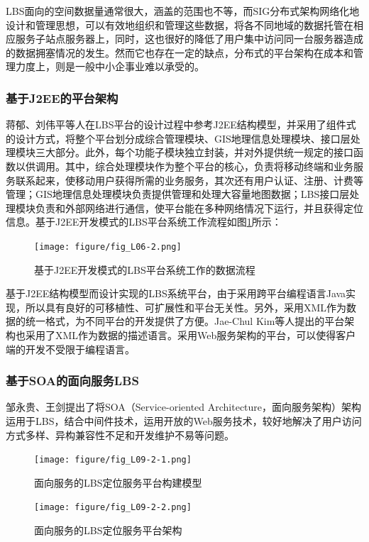 \documentclass{article}
\begin{document}
\begin{CJK}{UTF8}{gbsn}
	LBS面向的空间数据量通常很大，涵盖的范围也不等，而SIG分布式架构网络化地设计和管理思想，可以有效地组织和管理这些数据，将各不同地域的数据托管在相应服务子站点服务器上，同时，这也很好的降低了用户集中访问同一台服务器造成的数据拥塞情况的发生。然而它也存在一定的缺点，分布式的平台架构在成本和管理力度上，则是一般中小企事业难以承受的。

	\subsubsection{基于J2EE的平台架构}
  蒋郁、刘伟平等人在LBS平台的设计过程中参考J2EE结构模型，并采用了组件式的设计方式，将整个平台划分成综合管理模块、GIS地理信息处理模块、接口层处理模块三大部分。此外，每个功能子模块独立封装，并对外提供统一规定的接口函数以供调用\cite{L06}。其中，综合处理模块作为整个平台的核心，负责将移动终端和业务服务联系起来，使移动用户获得所需的业务服务，其次还有用户认证、注册、计费等管理；GIS地理信息处理模块负责提供管理和处理大容量地图数据；LBS接口层处理模块负责和外部网络进行通信，使平台能在多种网络情况下运行，并且获得定位信息。基于J2EE开发模式的LBS平台系统工作流程如图\ref{fig:L06-2}所示：

	\begin{figure}[htbp]
		\centering
		\texttt{[image: figure/fig\_L06-2.png]}
		\caption{基于J2EE开发模式的LBS平台系统工作的数据流程}
		\label{fig:L06-2}
	\end{figure}

  基于J2EE结构模型而设计实现的LBS系统平台，由于采用跨平台编程语言Java实现，所以具有良好的可移植性、可扩展性和平台无关性。另外，采用XML作为数据的统一格式，为不同平台的开发提供了方便。Jae-Chul Kim等人提出的平台架构也采用了XML作为数据的描述语言\cite{L13}。采用Web服务架构的平台，可以使得客户端的开发不受限于编程语言。

	\subsubsection{基于SOA的面向服务LBS}
  邹永贵、王剑提出了将SOA（Service-oriented Architecture，面向服务架构）架构运用于LBS，结合中间件技术，运用开放的Web服务技术，较好地解决了用户访问方式多样、异构兼容性不足和开发维护不易等问题\cite{L09}。

	\begin{figure}[htbp]
		\centering
		\texttt{[image: figure/fig\_L09-2-1.png]}
		\caption{面向服务的LBS定位服务平台构建模型}
		\label{fig:L09-2-1}
	\end{figure}

	\begin{figure}[htbp]
		\centering
		\texttt{[image: figure/fig\_L09-2-2.png]}
		\caption{面向服务的LBS定位服务平台架构}
		\label{fig:L09-2-2}
	\end{figure}


\end{CJK}
\end{document}
